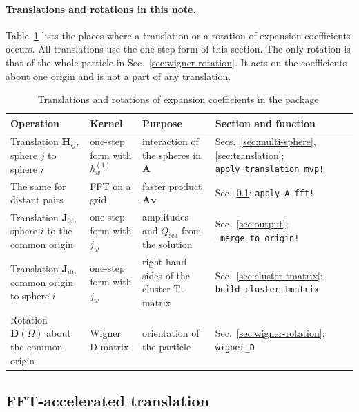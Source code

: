\documentclass[11pt,a4paper]{article}
\renewcommand{\arraystretch}{1.6}
\begin{document}
\paragraph{Translations and rotations in this note.}
Table~\ref{tab:translation-rotation} lists the places where a translation or a rotation of expansion coefficients occurs.
All translations use the one-step form of this section.
The only rotation is that of the whole particle in Sec.~\ref{sec:wigner-rotation}.
It acts on the coefficients about one origin and is not a part of any translation.

\begin{table}[htbp]
\caption{Translations and rotations of expansion coefficients in the package.}
\label{tab:translation-rotation}
\centering
\renewcommand{\arraystretch}{1.2}
\begin{tabular}{@{} >{\raggedright\arraybackslash}p{4.3cm} >{\raggedright\arraybackslash}p{2.4cm} >{\raggedright\arraybackslash}p{4.4cm} >{\raggedright\arraybackslash}p{4.6cm} @{}}
\toprule
Operation & Kernel & Purpose & Section and function \\
\midrule
Translation $\mathbf{H}_{ij}$, sphere $j$ to sphere $i$ & one-step form with $h_w^{(1)}$ & interaction of the spheres in $\mathbf{A}$ & Secs.~\ref{sec:multi-sphere}, \ref{sec:translation}; \texttt{apply\_translation\_mvp!} \\
The same for distant pairs & FFT on a grid & faster product $\mathbf{A}\bm{v}$ & Sec.~\ref{sec:fft-translation}; \texttt{apply\_A\_fft!} \\
Translation $\mathbf{J}_{0i}$, sphere $i$ to the common origin & one-step form with $j_w$ & amplitudes and $Q_\mathrm{sca}$ from the solution & Sec.~\ref{sec:output}; \texttt{\_merge\_to\_origin!} \\
Translation $\mathbf{J}_{i0}$, common origin to sphere $i$ & one-step form with $j_w$ & right-hand sides of the cluster T-matrix & Sec.~\ref{sec:cluster-tmatrix}; \texttt{build\_cluster\_tmatrix} \\
Rotation $\mathbf{D}(\Omega)$ about the common origin & Wigner D-matrix & orientation of the particle & Sec.~\ref{sec:wigner-rotation}; \texttt{wigner\_D} \\
\bottomrule
\end{tabular}
\end{table}

\subsection{FFT-accelerated translation}
\label{sec:fft-translation}
\end{document}
